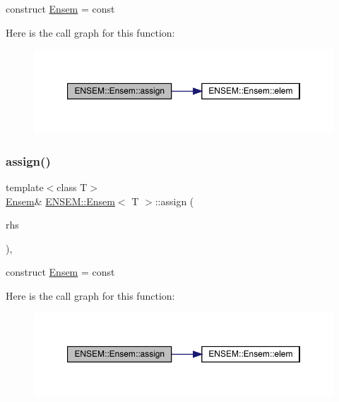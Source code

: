 construct \mbox{\hyperlink{classENSEM_1_1Ensem}{Ensem}} = const 

Here is the call graph for this function\+:
\nopagebreak
\begin{figure}[H]
\begin{center}
\leavevmode
\includegraphics[width=350pt]{d7/d3e/classENSEM_1_1Ensem_ae31c239c3dc966eaad70ec90489f5476_cgraph}
\end{center}
\end{figure}
\mbox{\label{classENSEM_1_1Ensem_ae31c239c3dc966eaad70ec90489f5476}} 
\subsubsection{\texorpdfstring{assign()}{assign()}\hspace{0.1cm}{\footnotesize\ttfamily [9/12]}}
{\footnotesize\ttfamily template$<$class T$>$ \\
\mbox{\hyperlink{classENSEM_1_1Ensem}{Ensem}}\& \mbox{\hyperlink{classENSEM_1_1Ensem}{E\+N\+S\+E\+M\+::\+Ensem}}$<$ T $>$\+::assign (\begin{DoxyParamCaption}\item[{const typename \mbox{\hyperlink{structENSEM_1_1WordType}{Word\+Type}}$<$ T $>$\+::Type\+\_\+t \&}]{rhs }\end{DoxyParamCaption})\hspace{0.3cm}{\ttfamily [inline]}, {\ttfamily [protected]}}



construct \mbox{\hyperlink{classENSEM_1_1Ensem}{Ensem}} = const 

Here is the call graph for this function\+:
\nopagebreak
\begin{figure}[H]
\begin{center}
\leavevmode
\includegraphics[width=350pt]{d7/d3e/classENSEM_1_1Ensem_ae31c239c3dc966eaad70ec90489f5476_cgraph}
\end{center}
\end{figure}
\mbox{\label{classENSEM_1_1Ensem_a140d8bb94d07a0abfb2ad396df63c625}} 
